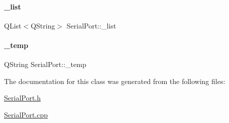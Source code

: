 \paragraph{\texorpdfstring{\+\_\+list}{\_list}}
{\footnotesize\ttfamily Q\+List$<$Q\+String$>$ Serial\+Port\+::\+\_\+list\hspace{0.3cm}{\ttfamily [private]}}

\mbox{\label{classSerialPort_a2f94f65fcf6950d7e033d48077f0282d}} 
\paragraph{\texorpdfstring{\+\_\+temp}{\_temp}}
{\footnotesize\ttfamily Q\+String Serial\+Port\+::\+\_\+temp\hspace{0.3cm}{\ttfamily [private]}}



The documentation for this class was generated from the following files\+:\begin{DoxyCompactItemize}
\item 
\hyperlink{SerialPort_8h}{Serial\+Port.\+h}\item 
\hyperlink{SerialPort_8cpp}{Serial\+Port.\+cpp}\end{DoxyCompactItemize}
